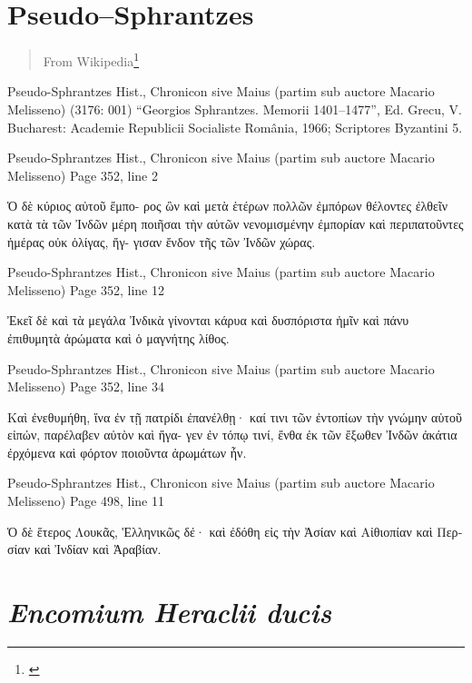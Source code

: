\documentclass[12pt,letterpaper,twoside,final]{memoir}
\begin{document}
\section{Pseudo--Sphrantzes}

\blockquote[From Wikipedia\footnote{\url{}}]{}

\begin{greek}


Pseudo-Sphrantzes Hist., Chronicon sive Maius (partim sub auctore Macario Melisseno) (3176: 001)
“Georgios Sphrantzes. Memorii 1401–1477”, Ed. Grecu, V.
Bucharest: Academie Republicii Socialiste România, 1966; Scriptores Byzantini 5.


Pseudo-Sphrantzes Hist., Chronicon sive Maius (partim sub auctore Macario Melisseno) 
Page 352, line 2

                                                                     Ὁ δὲ κύριος αὐτοῦ ἔμπο-
ρος ὢν καὶ μετὰ ἑτέρων πολλῶν ἐμπόρων θέλοντες ἐλθεῖν κατὰ τὰ τῶν Ἰνδῶν μέρη 
ποιῆσαι τὴν αὐτῶν νενομισμένην ἐμπορίαν καὶ περιπατοῦντες ἡμέρας οὐκ ὀλίγας, ἤγ-
γισαν ἔνδον τῆς τῶν Ἰνδῶν χώρας. 



Pseudo-Sphrantzes Hist., Chronicon sive Maius (partim sub auctore Macario Melisseno) 
Page 352, line 12

                                                     Ἐκεῖ δὲ καὶ τὰ μεγάλα Ἰνδικὰ γίνονται 
κάρυα καὶ δυσπόριστα ἡμῖν καὶ πάνυ ἐπιθυμητὰ ἀρώματα καὶ ὁ μαγνήτης λίθος. 



Pseudo-Sphrantzes Hist., Chronicon sive Maius (partim sub auctore Macario Melisseno) 
Page 352, line 34

                                                            Καὶ ἐνεθυμήθη, ἵνα ἐν τῇ πατρίδι 
ἐπανέλθῃ· καί τινι τῶν ἐντοπίων τὴν γνώμην αὑτοῦ εἰπών, παρέλαβεν αὐτὸν καὶ ἤγα-
γεν ἐν τόπῳ τινί, ἔνθα ἐκ τῶν ἔξωθεν Ἰνδῶν ἀκάτια ἐρχόμενα καὶ φόρτον ποιοῦντα 
ἀρωμάτων ἦν. 



Pseudo-Sphrantzes Hist., Chronicon sive Maius (partim sub auctore Macario Melisseno) 
Page 498, line 11

                                                                                      Ὁ δὲ ἕτερος 
Λουκᾶς, Ἑλληνικῶς δέ· καὶ ἐδόθη εἰς τὴν Ἀσίαν καὶ Αἰθιοπίαν καὶ Περσίαν καὶ 
Ἰνδίαν καὶ Ἀραβίαν. 

\end{greek}


\section{\emph{Encomium Heraclii ducis}}
\end{document}

